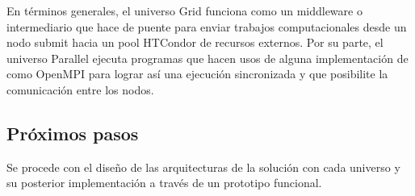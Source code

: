 En términos generales, el universo Grid funciona como un middleware o intermediario que hace de puente para enviar trabajos computacionales desde un nodo submit hacia un pool HTCondor de recursos externos. Por su parte, el universo Parallel ejecuta programas que hacen usos de alguna implementación de \MPI como OpenMPI para lograr así una ejecución sincronizada y que posibilite la comunicación entre los nodos.

\subsection{Próximos pasos}
Se procede con el diseño de las arquitecturas de la solución con cada universo y su posterior implementación a través de un prototipo funcional.
